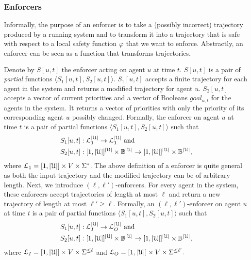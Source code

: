 \subsubsection*{Enforcers}
Informally, the purpose of an enforcer is to take a (possibly incorrect) trajectory produced by a running system and to transform it into a trajectory that is safe with respect to a local safety function $\varphi$ that we want to enforce. Abstractly, an enforcer can be seen as a function that transforms trajectories. 

Denote by $S[u,t]$ the enforcer acting on agent $u$ at time $t$. $S[u,t]$ is a pair of \emph{partial} functions $\langle S_1[u,t],S_2[u,t] \rangle$. $S_1[u,t]$ accepts a finite trajectory for each agent in the system and returns a modified trajectory for agent $u$. $S_2[u,t]$ accepts a vector of current priorities and a vector of Booleans $goal_{u,t}$ for the agents in the system. It returns a vector of priorities with only the priority of its corresponding agent $u$ possibly changed. Formally, the enforcer on agent $u$ at time $t$ is a pair of partial functions $\langle S_1[u,t],S_2[u,t] \rangle$ such that
\begin{align}
    &S_1[u,t] : \mathcal{L}_1 ^{|\mathcal{U}|} \to \mathcal{L}_1^{|\mathcal{U}|} \text { and } \\
    &S_2[u,t] : [1,|\mathcal{U}|]^{|\mathcal{U}|} \times \mathbb{B}^{|\mathcal{U}|} \to [1,|\mathcal{U}|]^{|\mathcal{U}|} \times \mathbb{B}^{|\mathcal{U}|}, 
\end{align}
\noindent where $\mathcal{L}_1 = [1,|\mathcal{U}|] \times V \times \Sigma^*$. The above definition of a enforcer is quite general as both the input trajectory and the modified trajectory can be of arbitrary length. Next, we introduce $(\ell,\ell')$-enforcers. For every agent in the system, these enforcers accept trajectories of length at most $\ell$ and return a new trajectory of length at most $\ell' \geq \ell$.  
Formally, an $(\ell,\ell')$-enforcer 
on agent $u$ at time $t$ is a pair of partial functions $\langle S_1[u,t],S_2[u,t] \rangle$ such that 
\begin{align}
    &S_1[u,t] : \mathcal{L}_I ^{|\mathcal{U}|} \to \mathcal{L}_O ^{|\mathcal{U}|} \text{ and } \\ 
    &S_2[u,t] : [1,|\mathcal{U}|]^{|\mathcal{U}|} \times \mathbb{B}^{|\mathcal{U}|} \to [1,|\mathcal{U}|]^{|\mathcal{U}|} \times \mathbb{B}^{|\mathcal{U}|}, 
\end{align}
\noindent where $\mathcal{L}_I = [1,|\mathcal{U}|] \times V \times \Sigma^{\leq \ell}$ and $\mathcal{L}_O = [1,|\mathcal{U}|] \times V \times \Sigma^{\leq \ell'}.$

